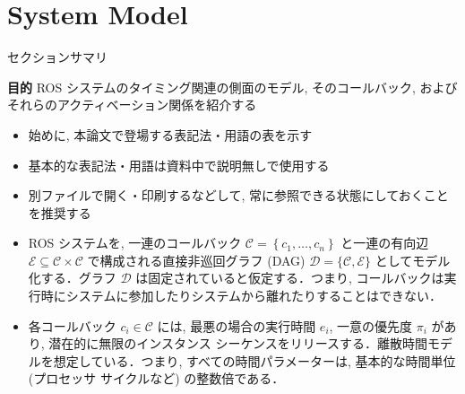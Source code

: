 
\section{System Model}
\label{sec: system model}

\begin{frame}{セクションサマリ}
    \begin{itembox}[l]{\textbf{目的}}
        ROS システムのタイミング関連の側面のモデル, そのコールバック, およびそれらのアクティベーション関係を紹介する
    \end{itembox}
\end{frame}

\begin{frame}{}
    \begin{itemize}
        \item 始めに, 本論文で登場する表記法・用語の表を示す
        \item 基本的な表記法・用語は資料中で説明無しで使用する
        \item 別ファイルで開く・印刷するなどして, 常に参照できる状態にしておくことを推奨する
    \end{itemize}
\end{frame}



\begin{frame}{}
    \begin{itemize}
        \item ROS システムを, 一連のコールバック $\mathcal{C}=\left\{c_{1}, \ldots, c_{n}\right\}$ と一連の有向辺 $\mathcal{E} \subseteq \mathcal{C} \times \mathcal{C}$ で構成される直接非巡回グラフ (DAG) $\mathcal{D}=\{\mathcal{C}, \mathcal{E}\}$ としてモデル化する．グラフ $\mathcal{D}$ は固定されていると仮定する．つまり, コールバックは実行時にシステムに参加したりシステムから離れたりすることはできない．
    \end{itemize}
\end{frame}

\begin{frame}{}
    \begin{itemize}
        \item 各コールバック $c_{i} \in \mathcal{C}$ には, 最悪の場合の実行時間 $e_{i}$, 一意の優先度 $\pi_{i}$ があり, 潜在的に無限のインスタンス シーケンスをリリースする．離散時間モデルを想定している．つまり, すべての時間パラメーターは, 基本的な時間単位 (プロセッサ サイクルなど) の整数倍である．
    \end{itemize}
\end{frame}

